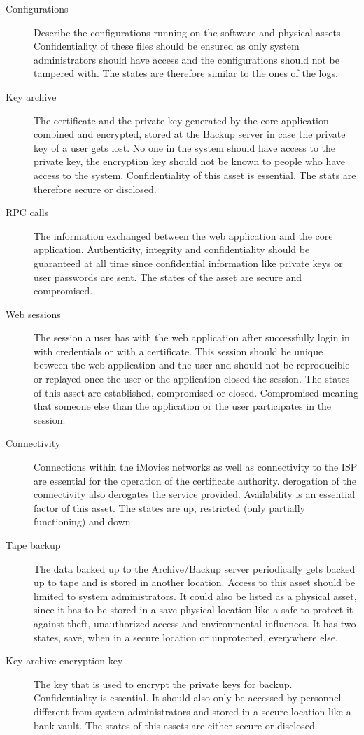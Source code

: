\documentclass[a4paper, toc=index, 12pt, DIV14, twoside, BCOR2cm, headsepline, numbers=noenddot, bibliography=totoc]{scrbook}
\begin{document}
\begin{description}
\item[Configurations ] Describe the configurations running on the software and physical assets. Confidentiality of these files should be ensured as only system administrators should have access and the configurations should not be tampered with. The states are therefore similar to the ones of the logs.
\item[Key archive ] The certificate and the private key generated by the core application combined and encrypted, stored at the Backup server in case the private key of a user gets lost. No one in the system should have access to the private key, the encryption key should not be known to people who have access to the system. Confidentiality of this asset is essential. The stats are therefore secure or disclosed.
\item[RPC calls ] The information exchanged between the web application and the core application. Authenticity, integrity and confidentiality should be guaranteed at all time since confidential information like private keys or user passwords are sent. The states of the asset are secure and compromised.
\item[Web sessions ] The session a user has with the web application after successfully login in with credentials or with a certificate. This session should be unique between the web application and the user and should not be reproducible or replayed once the user or the application closed the session. The states of this asset are established, compromised or closed. Compromised meaning that someone else than the application or the user participates in the session.
\item[Connectivity ] Connections within the iMovies networks as well as connectivity to the ISP are essential for the operation of the certificate authority. derogation of the connectivity also derogates the service provided. Availability is an essential factor of this asset. The states are up, restricted (only partially functioning) and down.
\item[Tape backup ] The data backed up to the Archive/Backup server periodically gets backed up to tape and is stored in another location. Access to this asset should be limited to system administrators. It could also be listed as a physical asset, since it has to be stored in a save physical location like a safe to protect it against theft, unauthorized access and environmental influences. It has two states, save, when in a secure location or unprotected, everywhere else.
\item[Key archive encryption key] The key that is used to encrypt the private keys for backup. Confidentiality is essential. It should also only be accessed by personnel different from system administrators and stored in a secure location like a bank vault. The states of this assets are either secure or disclosed.

\end{description}
\end{document}
